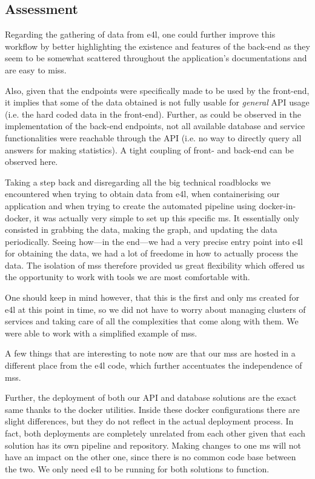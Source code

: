 \subsection{Assessment}

Regarding the gathering of data from \gls{e4l}, one could further
improve this workflow by better highlighting the existence and
features of the back-end as they seem to be somewhat scattered
throughout the application's documentations and are easy to miss.

Also, given that the endpoints were specifically made to be used by
the front-end, it implies that some of the data obtained is not fully
usable for \textit{general} API usage (i.e. the hard coded data in the
front-end). Further, as could be observed in the implementation of the
back-end endpoints, not all available database and service
functionalities were reachable through the API (i.e. no way to
directly query all answers for making statistics). A tight coupling of
front- and back-end can be observed here.

Taking a step back and disregarding all the big technical roadblocks
we encountered when trying to obtain data from \gls{e4l}, when
containerising our application and when trying to create the automated
pipeline using docker-in-docker, it was actually very simple to set up
this specific \gls{ms}. It essentially only consisted in grabbing the
data, making the graph, and updating the data periodically. Seeing
how---in the end---we had a very precise entry point into \gls{e4l}
for obtaining the data, we had a lot of freedome in how to actually
process the data. The isolation of \glspl{ms} therefore provided us
great flexibility which offered us the opportunity to work with tools
we are most comfortable with.

One should keep in mind however, that this is the first and only
\gls{ms} created for \gls{e4l} at this point in time, so we did not
have to worry about managing clusters of services and taking care of
all the complexities that come along with them. We were able to work
with a simplified example of \glspl{ms}.


A few things that are interesting to note now are that our \glspl{ms}
are hosted in a different place from the \gls{e4l} code, which further
accentuates the independence of \glspl{ms}.

Further, the deployment of both our API and database solutions are the
exact same thanks to the docker utilities. Inside these docker
configurations there are slight differences, but they do not reflect
in the actual deployment process. In fact, both deployments are
completely unrelated from each other given that each solution has its
own pipeline and repository. Making changes to one \gls{ms} will not
have an impact on the other one, since there is no common code base
between the two. We only need \gls{e4l} to be running for both
solutions to function.

